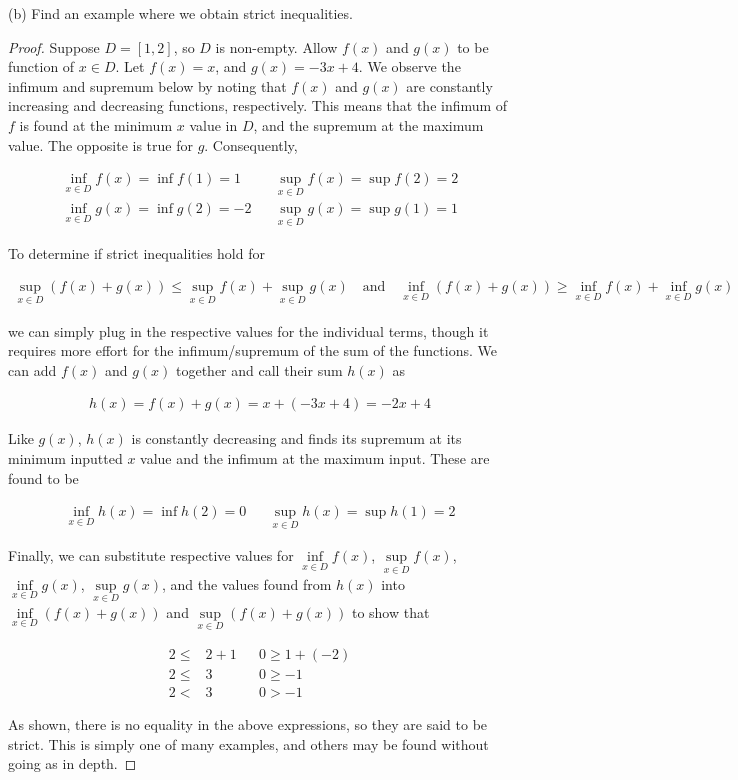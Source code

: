 \documentclass[12pt]{article}
\begin{document}
\newpage

\noindent (b) Find an example where we obtain strict inequalities.

\begin{proof}

Suppose $D=[1,2]$, so $D$ is non-empty. Allow $f(x)$ and $g(x)$ to be function of $x\in D$. Let $f(x)=x$, and $g(x)=-3x+4$. We observe the infimum and supremum below by noting that $f(x)$ and $g(x)$ are constantly increasing and decreasing functions, respectively. This means that the infimum of $f$ is found at the minimum $x$ value in $D$, and the supremum at the maximum value. The opposite is true for $g$. Consequently,

\begin{align*}
	\underset{x\in D}{\inf}f(x)=\inf f(1) = 1 && \underset{x\in D}{\sup}f(x)=\sup f(2) = 2 \\
	\underset{x\in D}{\inf}g(x)=\inf g(2) = -2 && \underset{x\in D}{\sup}g(x)=\sup g(1) = 1
\end{align*}

To determine if strict inequalities hold for 

\begin{align*}
	\underset{x\in D}{\sup}(f(x) + g(x))\le\underset{x\in D}{\sup}f(x) + \underset{x\in D}{\sup}g(x) \quad \text{and} \quad \underset{x\in D}{\inf}(f(x)+g(x))\ge \underset{x\in D}{\inf}f(x) + \underset{x\in D}{\inf}g(x)
\end{align*}

\noindent we can simply plug in the respective values for the individual terms, though it requires more effort for the infimum/supremum of the sum of the functions. We can add $f(x)$ and $g(x)$ together and call their sum $h(x)$ as

\begin{align*}
	h(x)=f(x)+g(x)=x+(-3x+4)=-2x+4
\end{align*}

\noindent Like $g(x)$, $h(x)$ is constantly decreasing and finds its supremum at its minimum inputted $x$ value and the infimum at the maximum input. These are found to be

\begin{align*}
	\underset{x\in D}{\inf}h(x)=\inf h(2) = 0 && \underset{x\in D}{\sup}h(x)=\sup h(1) = 2
\end{align*}

Finally, we can substitute respective values for $\underset{x\in D}{\inf}f(x)$, $\underset{x\in D}{\sup}f(x)$, $\underset{x\in D}{\inf}g(x)$, $\underset{x\in D}{\sup}g(x)$, and the values found from $h(x)$ into $\underset{x\in D}{\inf}(f(x) + g(x))$ and $\underset{x\in D}{\sup}(f(x) + g(x))$ to show that

\begin{align*}
	2 \le& 2 + 1 && 0 \ge 1 + (-2) \\
	2\le& 3 && 0\ge -1 \\
	2 <& 3 && 0>-1
\end{align*}

As shown, there is no equality in the above expressions, so they are said to be strict. This is simply one of many examples, and others may be found without going as in depth.

\end{proof}
\end{document}
